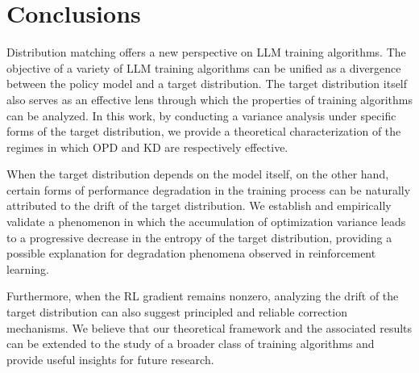 \section{Conclusions}

Distribution matching offers a new perspective on LLM training algorithms. The objective of a variety of LLM training algorithms can be unified as a divergence between the policy model and a target distribution. The target distribution itself also serves as an effective lens through which the properties of training algorithms can be analyzed. In this work, by conducting a variance analysis under specific forms of the target distribution, we provide a theoretical characterization of the regimes in which OPD and KD are respectively effective.

When the target distribution depends on the model itself, on the other hand, certain forms of performance degradation in the training process can be naturally attributed to the drift of the target distribution. We establish and empirically validate a phenomenon in which the accumulation of optimization variance leads to a progressive decrease in the entropy of the target distribution, providing a possible explanation for degradation phenomena observed in reinforcement learning.

Furthermore, when the RL gradient remains nonzero, analyzing the drift of the target distribution can also suggest principled and reliable correction mechanisms. We believe that our theoretical framework and the associated results can be extended to the study of a broader class of training algorithms and provide useful insights for future research.
